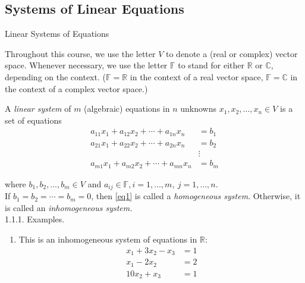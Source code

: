 \documentclass[smaller,hyperref={CJKbookmarks=true}]{beamer}
\newcommand{\C}{\mathbb{C}} \newcommand{\F}{\mathbb{F}} \newcommand{\R}{\mathbb{R}} \newcommand{\Q}{\mathbb{Q}}
\newcommand{\myseries}[2]{$#1_1,#1_2,\dots,#1_#2$}
\begin{document}
\subsection{Systems of Linear Equations}
\begin{frame}[c]
\begin{spacing}{2.5}
\tableofcontents[sectionstyle=hide,subsectionstyle=show/shaded/hide] \end{spacing}
\end{frame}
\begin{frame}{Linear Systems of Equations} \begin{spacing}{1}
Throughout this course, we use the letter $V$ to denote a (real or complex) vector space. Whenever necessary, we use the letter $\mathbb{F}$ to stand for either $\mathbb{R}$ or $\mathbb{C}$, depending on the context. ($\F=\R$ in the context of a real vector space, $\F=\C$ in the context of a complex vector space.)\end{spacing}
A \emph{linear system} of $m$ (algebraic) equations in $n$ unknowns \myseries{x}{n}$\in V$ is a set of equations
\begin{equation}
\begin{aligned}
a_{11}x_1+a_{12}x_2+\cdots+a_{1n}x_n &=b_1 \\
a_{21}x_1+a_{22}x_2+\cdots+a_{2n}x_n   &=b_2  \\
&\vdots  \\
a_{m1}x_1+a_{m2}x_2+\cdots+a_{mn}x_n  &=b_m
\end{aligned} 
\label{eq1}
\end{equation} \begin{spacing}{0.9}
where \myseries{b}{m}$\in V$ and $a_{ij}\in\F,i=1,\ldots,m,~j=1,\ldots,n.$\\
If $b_1=b_2=\cdots=b_m=0$, then \eqref{eq1} is called a \emph{homogeneous system}. Otherwise, it is called an \emph{inhomogeneous system.}\\
\alert{1.1.1. Examples.}
\begin{enumerate}[1.]
  \item This is an inhomogeneous system of equations in $\mathbb{R}$:
      \begin{equation*}
      \begin{split}
        x_1+3x_2-x_3&=1\\
        x_1-2x_2~~~~~~&=2\\
        10x_2+x_3&=1
        \end{split}
      \end{equation*}

\end{enumerate}
\end{spacing}
\end{frame}
\end{document}
